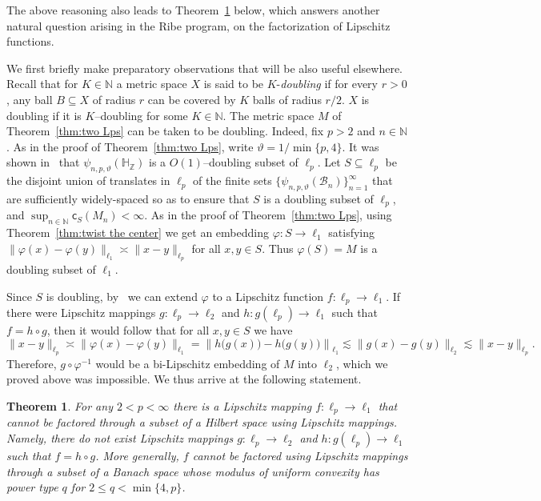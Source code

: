 \documentclass[11pt,reqno]{amsart}
\renewcommand{\H}{\mathbb{H}}
\newcommand{\N}{\mathbb{N}}
\newcommand{\Z}{\mathbb{Z}}
\newcommand{\cc}{{\mathsf{c}}}
\newcommand{\0}{\mathbf{0}}
\renewcommand{\1}{\mathbf 1}
\newcommand{\from}{\colon}
\renewcommand{\subset}{\subseteq}
\renewcommand{\le}{\leqslant}
\newtheorem{thm}{Theorem}[section]
\theoremstyle{remark}
\begin{document}
\medskip

The above reasoning also leads to Theorem~\ref{thm:factorization} below, which answers another natural question arising in the Ribe program, on the factorization of Lipschitz functions.

We first briefly make preparatory observations that will be also useful elsewhere. Recall that for $K\in \N$ a metric space $X$ is said to be $K$-{\em doubling} if for every $r>0$, any ball $B\subset X$ of radius $r$ can be covered by $K$ balls of radius $r/2$. $X$ is doubling if it is $K$--doubling for some $K\in \N$. The metric space $M$ of Theorem~\ref{thm:two Lps} can be taken to be doubling. Indeed, fix $p>2$ and $n\in \N$. As in the proof of Theorem~\ref{thm:two Lps}, write $\vartheta=1/\min\{p,4\}$. It was shown in~\cite{LN14} that $\psi_{n,p,\vartheta}(\H_\Z)$ is a $O(1)$--doubling subset of $\ell_p$. Let $S\subset \ell_p$ be the disjoint union of  translates in $\ell_p$ of the finite sets $\{\psi_{n,p,\vartheta}(\mathcal{B}_n)\}_{n=1}^\infty$ that are sufficiently widely-spaced so as to ensure that $S$ is a doubling subset of $\ell_p$, and $\sup_{n\in \N}\cc_S(M_n)<\infty$. As in the proof of Theorem~\ref{thm:two Lps}, using Theorem~\ref{thm:twist the center} we get an embedding $\varphi\from S\to \ell_1$ satisfying $\|\varphi(x)-\varphi(y)\|_{\ell_1}\asymp \|x-y\|_{\ell_p}$ for all $x,y\in S$. Thus $\varphi(S)=M$ is a doubling subset of $\ell_1$.

Since $S$ is doubling, by~\cite{LN05} we can extend $\varphi$ to a Lipschitz function $f\from\ell_p\to \ell_1$. If there were Lipschitz mappings  $g\from\ell_p\to \ell_2$ and $h\from g(\ell_p)\to \ell_1$ such that $f=h\circ g$, then it would follow that for all $x,y\in S$ we have
$$
\|x-y\|_{\ell_p}\asymp \|\varphi(x)-\varphi(y)\|_{\ell_1}=\left\|h\big(g(x)\big)-h\big(g(y)\big)\right\|_{\ell_1}\lesssim \|g(x)-g(y)\|_{\ell_2}\lesssim \|x-y\|_{\ell_p}.
$$
Therefore, $g\circ\varphi^{-1}$ would be a bi-Lipschitz embedding of $M$ into $\ell_2$, which we proved above was impossible. We thus arrive at the following statement.



\begin{thm}\label{thm:factorization} For any $2<p<\infty$ there is a Lipschitz mapping $f\from \ell_p\to \ell_1$ that cannot be factored through a subset of a Hilbert space using Lipschitz mappings. Namely, there do not exist Lipschitz mappings $g\from \ell_p\to \ell_2$ and $h\from g(\ell_p)\to \ell_1$ such that $f=h\circ g$. More generally, $f$ cannot be factored  using Lipschitz mappings through a subset of a Banach space whose modulus of uniform convexity has power type $q$ for $2\le q<\min\{4,p\}$.
\end{thm}
\end{document}
